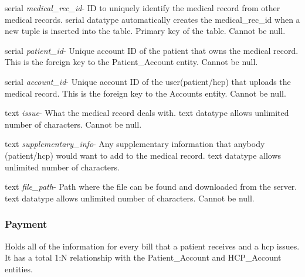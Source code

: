 \documentclass[10pt]{report}
\begin{document}
\begin{description}
\item serial \textit{medical\_rec\_id}- ID to uniquely identify the medical record from other medical records. serial datatype automatically creates the medical\_rec\_id when a new tuple is inserted into the table.  Primary key of the table.  Cannot be null.
\item serial \textit{patient\_id}- Unique account ID of the patient that owns the medical record.  This is the foreign key to the Patient\_Account entity.  Cannot be null.
\item serial \textit{account\_id}- Unique account ID of the user(patient/hcp) that uploads the medical record.  This is the foreign key to the Accounts entity.  Cannot be null.
\item text \textit{issue}-  What the medical record deals with.  text datatype allows unlimited number of characters.  Cannot be null.
\item text \textit{supplementary\_info}- Any supplementary information that anybody (patient/hcp) would want to add to the medical record.  text datatype allows unlimited number of characters.
\item text \textit{file\_path}- Path where the file can be found and downloaded from the server.  text datatype allows unlimited number of characters.  Cannot be null.
\end{description}

\subsubsection{Payment}
Holds all of the information for every bill that a patient receives and a hcp issues.  It has a total 1:N relationship with the Patient\_Account and HCP\_Account entities.
\end{document}
